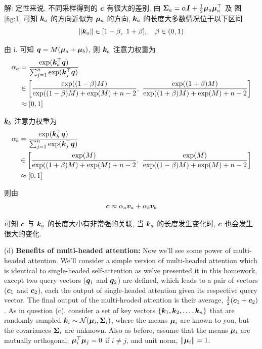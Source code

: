 \documentclass{article}
\begin{document}
解: 定性来说, 不同采样得到的 $\bm{c}$ 有很大的差别. 由 $\bm{\Sigma}_{a}=\alpha \bm{I}+\frac{1}{2}\bm{\mu}_{a} \bm{\mu}_{a}^{\top}$ 及 图 \ref{fig:1} 可知 $\bm{k}_a$ 的方向近似为 $\bm{\mu}_a$ 的方向, $\bm{k}_a$ 的长度大多数情况位于以下区间
\begin{equation}
  \|\bm{k}_a\|\in[1-\beta,~1+\beta],\quad\beta\in(0,1)
\end{equation}

由 i. 可知 $\bm{q}=M(\bm{\mu}_a+\bm{\mu}_b)$, 则 $\bm{k}_a$ 注意力权重为
\begin{equation}
  \begin{aligned}
    \alpha_a
    &=\frac{\exp(\bm{k}_{a}^{\top}\bm{q})}{\sum_{j=1}^{n}\exp(\bm{k}_{j}^{\top}\bm{q})}\\
    &\in\left[\frac{\exp((1-\beta)M)}{\exp((1-\beta)M)+\exp(M)+n-2},~\frac{\exp((1+\beta)M)}{\exp((1+\beta)M)+\exp(M)+n-2}\right]\\
    &\approx[0,1]\\
  \end{aligned}
\end{equation}

$\bm{k}_b$ 注意力权重为
\begin{equation}
  \begin{aligned}
    \alpha_b
    &=\frac{\exp(\bm{k}_{b}^{\top}\bm{q})}{\sum_{j=1}^{n}\exp(\bm{k}_{j}^{\top}\bm{q})}\\
    &\in\left[\frac{\exp(M)}{\exp((1+\beta)M)+\exp(M)+n-2},~\frac{\exp(M)}{\exp((1-\beta)M)+\exp(M)+n-2}\right]\\
    &\approx[0,1]\\
  \end{aligned}
\end{equation}

则由
\begin{equation}
  \bm{c}\approx\alpha_a\bm{v}_a+\alpha_b\bm{v}_b
\end{equation}

可知 $\bm{c}$ 与 $\bm{k}_a$ 的长度大小有非常强的关联, 当 $\bm{k}_a$ 的长度发生变化时, $\bm{c}$ 也会发生很大的变化.

(d) \textbf{Benefits of multi-headed attention:} Now we'll see some power of multi-headed attention. We'll consider a simple version of multi-headed attention which is identical to single-headed self-attention as we've presented it in this homework, except two query vectors ($\bm{q}_1$ and $\bm{q}_2$) are defined, which leads to a pair of vectors ($\bm{c}_1$ and $\bm{c}_2$), each the output of single-headed attention given its respective query vector. The final output of the multi-headed attention is their average, $\frac{1}{2}(\bm{c}_{1}+\bm{c}_{2})$. As in question (c), consider a set of key vectors $\{\bm{k}_{1},\bm{k}_2,\dots, \bm{k}_{n}\}$ that are randomly sampled $\bm{k}_{i} \sim \mathcal{N}(\bm{\mu}_{i}, \bm{\Sigma}_{i})$, where the means $\bm{\mu}_i$ are known to you, but the covariances $\bm{\Sigma}_{i}$ are unknown. Also as before, assume that the means $\bm{\mu}_i$ are mutually orthogonal; $\bm{\mu}_{i}^{\top} \bm{\mu}_{j}=0$ if $i \neq j$, and unit norm, $\|\bm{\mu}_{i}\|=1$.
\end{document}
